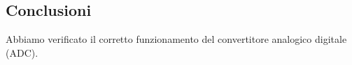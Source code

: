 \subsection*{Conclusioni}

Abbiamo verificato il corretto funzionamento del convertitore analogico digitale (ADC).
